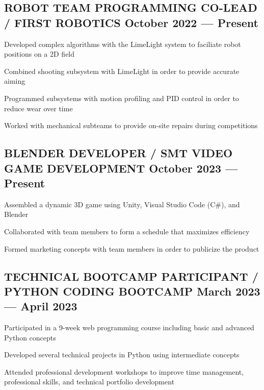 \subsection{{ROBOT TEAM PROGRAMMING CO-LEAD / FIRST ROBOTICS \hfill October 2022 --- Present}}
\begin{zitemize}
\item Developed complex algorithms with the LimeLight system to faciliate robot positions on a 2D field  %
\item Combined shooting subsystem with LimeLight in order to provide accurate aiming
\item Programmed subsystems with motion profiling and PID control in order to reduce wear over time
\item Worked with mechanical subteams to provide on-site repairs during competitions
\end{zitemize}

\subsection{{BLENDER DEVELOPER / SMT VIDEO GAME DEVELOPMENT \hfill October 2023 --- Present}}
\begin{zitemize}
\item Assembled a dynamic 3D game using Unity, Visual Studio Code (C\#), and Blender
\item Collaborated with team members to form a schedule that maximizes efficiency
\item Formed marketing concepts with team members in order to publicize the product
\end{zitemize}

\subsection{{TECHNICAL BOOTCAMP PARTICIPANT / PYTHON CODING BOOTCAMP \hfill March 2023 --- April 2023}}
\begin{zitemize}
\item Participated in a 9-week web programming course including basic and advanced Python concepts
\item Developed several technical projects in Python using intermediate concepts
\item Attended professional development workshops to improve time management, professional skills, and technical portfolio development 
\end{zitemize}

